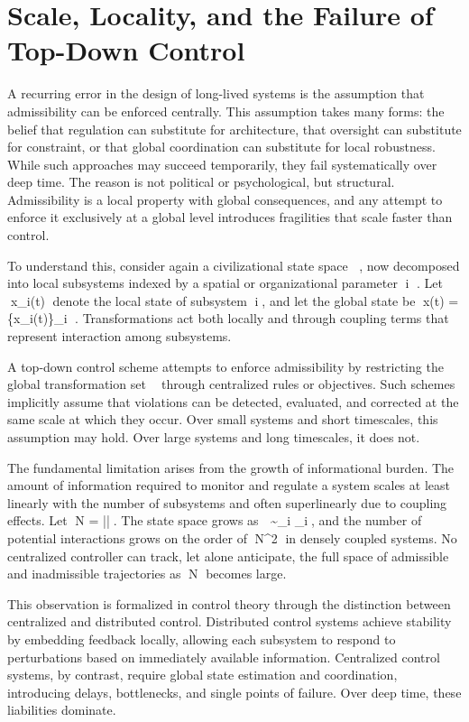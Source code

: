 \documentclass[12pt,oneside]{book}
\begin{document}
\chapter{Scale, Locality, and the Failure of Top-Down Control}

A recurring error in the design of long-lived systems is the assumption that admissibility can be enforced centrally. This assumption takes many forms: the belief that regulation can substitute for architecture, that oversight can substitute for constraint, or that global coordination can substitute for local robustness. While such approaches may succeed temporarily, they fail systematically over deep time. The reason is not political or psychological, but structural. Admissibility is a local property with global consequences, and any attempt to enforce it exclusively at a global level introduces fragilities that scale faster than control.

To understand this, consider again a civilizational state space , now decomposed into local subsystems indexed by a spatial or organizational parameter i \in {}. Let x_i(t) denote the local state of subsystem i, and let the global state be x(t) = \{x_i(t)\}_{i \in {}}. Transformations act both locally and through coupling terms that represent interaction among subsystems.

A top-down control scheme attempts to enforce admissibility by restricting the global transformation set  through centralized rules or objectives. Such schemes implicitly assume that violations can be detected, evaluated, and corrected at the same scale at which they occur. Over small systems and short timescales, this assumption may hold. Over large systems and long timescales, it does not.

The fundamental limitation arises from the growth of informational burden. The amount of information required to monitor and regulate a system scales at least linearly with the number of subsystems and often superlinearly due to coupling effects. Let N = ||. The state space grows as  \sim \prod_i _i, and the number of potential interactions grows on the order of N^2 in densely coupled systems. No centralized controller can track, let alone anticipate, the full space of admissible and inadmissible trajectories as N becomes large.

This observation is formalized in control theory through the distinction between centralized and distributed control. Distributed control systems achieve stability by embedding feedback locally, allowing each subsystem to respond to perturbations based on immediately available information. Centralized control systems, by contrast, require global state estimation and coordination, introducing delays, bottlenecks, and single points of failure. Over deep time, these liabilities dominate.
\end{document}
